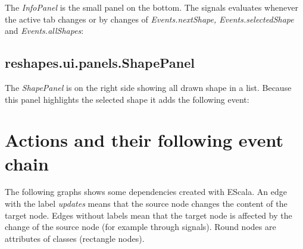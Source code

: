 The \textit{InfoPanel} is the small panel on the bottom.
The signals evaluates whenever the active tab changes or by changes of \textit{Events.nextShape, Events.selectedShape} and \textit{Events.allShapes}: \\

\subsection{reshapes.ui.panels.ShapePanel}

The \textit{ShapePanel} is on the right side showing all drawn shape in a list.
Because this panel highlights the selected shape it adds the following event: \\

\section{Actions and their following event chain}

The following graphs shows some dependencies created with EScala. 
An edge with the label \textit{updates} means that the source node changes the content of the target node. 
Edges without labels mean that the target node is affected by the change of the source node (for example through signals).
Round nodes are attributes of classes (rectangle nodes).

